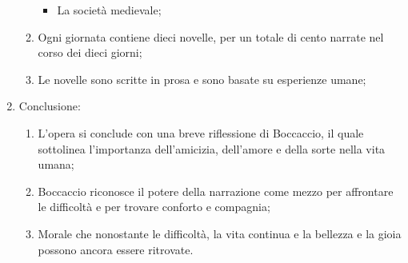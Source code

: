 \documentclass{article}
\begin{document}
\begin{enumerate}
\begin{enumerate}[label*=\arabic*.]
\begin{itemize}
                \item La società medievale;
            \end{itemize}
        \item Ogni giornata contiene dieci novelle, per un totale di cento narrate nel corso
            dei dieci giorni;
        \item Le novelle sono scritte in prosa e sono basate su esperienze umane;
        \end{enumerate}
    \item Conclusione:
        \begin{enumerate}[label*=\arabic*.]
            \item L'opera si conclude con una breve riflessione di Boccaccio, il quale
                sottolinea l'importanza dell'amicizia, dell'amore e della sorte nella vita
                umana;
            \item Boccaccio riconosce il potere della narrazione come mezzo per affrontare le
                difficoltà e per trovare conforto e compagnia;
            \item Morale che nonostante le difficoltà, la vita continua e la bellezza e la
                gioia possono ancora essere ritrovate.
        \end{enumerate}
\end{enumerate}

\newpage
\end{document}
